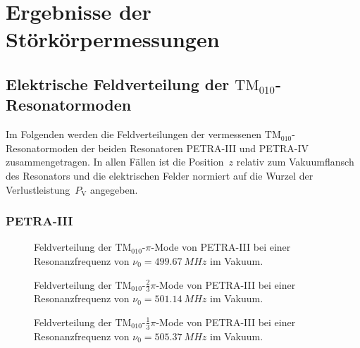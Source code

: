 \chapter{Ergebnisse der Störkörpermessungen}
\label{sec:appendix_felder}

\section{Elektrische Feldverteilung der $\mathrm{TM}_{010}$-Resonatormoden}
\label{app:tm010_felder}
Im Folgenden werden die Feldverteilungen der vermessenen $\mathrm{TM}_{010}$-Resonatormoden der beiden Resonatoren PETRA-III und PETRA-IV zusammengetragen.
In allen Fällen ist die Position~$z$ relativ zum Vakuumflansch des Resonators und die elektrischen Felder normiert auf die Wurzel der Verlustleistung~$P_\mathrm{V}$ angegeben.

\subsection{PETRA-III}
\FloatBarrier
\begin{figure}[h]
  \centering
  
  \caption[Feldverteilung der $\mathrm{TM}_{010}\text{-}\pi$-Mode von PETRA-III]{Feldverteilung der $\mathrm{TM}_{010}\text{-}\pi$-Mode von PETRA-III bei einer Resonanzfrequenz von \mbox{$\nu_0 = \SI{499.67}{MHz}$} im Vakuum.}
\end{figure}

\begin{figure}[p]
	\centering
	
	
	\caption[Feldverteilung der $\mathrm{TM}_{010}\text{-}\frac{2}{3}\pi$-Mode von PETRA-III]{Feldverteilung der $\mathrm{TM}_{010}\text{-}\frac{2}{3}\pi$-Mode von PETRA-III bei einer Resonanzfrequenz von \mbox{$\nu_0 = \SI{501.14}{MHz}$} im Vakuum.}
	
	
	\caption[Feldverteilung der $\mathrm{TM}_{010}\text{-}\frac{1}{3}\pi$-Mode von PETRA-III]{Feldverteilung der $\mathrm{TM}_{010}\text{-}\frac{1}{3}\pi$-Mode von PETRA-III bei einer Resonanzfrequenz von \mbox{$\nu_0 = \SI{505.37}{MHz}$} im Vakuum.}
\end{figure}

